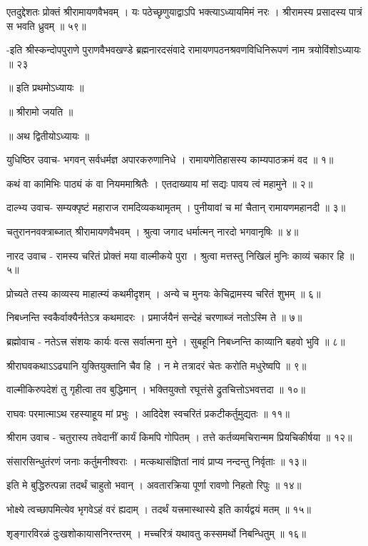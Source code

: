 एतदुद्देशतः प्रोक्तं श्रीरामायणवैभवम् ।
यः पठेच्छृणुयाद्वाऽपि भक्त्याऽध्यायमिमं नरः ।
श्रीरामस्य प्रसादस्य पात्रं स भवति ध्रुवम् ॥ ५९॥

-इति श्रीस्कन्दोपपुराणे पुराणवैभवखण्डे ब्रह्मनारदसंवादे
रामायणपठनश्रवणविधिनिरूपणं नाम त्रयोविंशोऽध्यायः ॥ २३

॥ इति प्रथमोऽध्यायः ॥

॥ श्रीरामो जयति ॥

॥ अथ द्वितीयोऽध्यायः ॥

युधिष्ठिर उवाच-
भगवन् सर्वधर्मज्ञ अपारकरुणानिधे ।
रामायणेतिहासस्य काम्यपाठक्रमं वद ॥ १॥

कथं वा कामिभिः पाठ्यं कं वा नियममाश्रितैः ।
एतदाख्याय मां सद्यः पावय त्वं महामुने ॥ २॥

दाल्भ्य उवाच-
सम्यक्पृष्टं महाराज रामदिव्यकथामृतम् ।
पुनीयावां च मां चैतान् रामायणमहानदी ॥ ३॥

चतुराननवक्त्राब्जात् श्रीरामायणवैभवम् ।
श्रुत्वा जगाद धर्मात्मन् नारदो भगवानृषिः ॥ ४॥

नारद उवाच -
रामस्य चरितं प्रोक्तं मया वाल्मीकये पुरा ।
श्रुत्वा मत्तस्तु निखिलं मुनिः काव्यं चकार हि ॥ ५॥

प्रोच्यते तस्य काव्यस्य माहात्म्यं कथमीदृशम् ।
अन्ये च मुनयः केचिद्रामस्य चरितं शुभम् ॥ ६॥

निबध्नन्ति स्वकैर्वाक्यैर्नतेऽत्र कथमादरः ।
प्रमार्जयैनं सन्देहं चरणाब्जं नतोऽस्मि ते ॥ ७॥

ब्रह्मोवाच -
नतेऽत्त्र संशयः कार्यः वत्स सर्वात्मना मुने ।
सुबहूनि निबध्नन्ति काव्यानि बहवो भुवि ॥ ८॥

श्रीराघवकथाऽऽढ्यानि युक्तियुक्तानि चैव हि ।
न मे तत्रादरं चेतः करोति मधुरेष्वपि ॥ ९॥

वाल्मीकिरुपदेशं तु गृहीत्वा तव बुद्धिमान् ।
भक्तियुक्तो रघूत्तंसे द्रुतचित्तोऽभवत्तदा ॥ १०॥

राघवः परमात्माऽथ रहस्याहूय मां प्रभुः ।
आदिदेश स्वचरितं प्रकटीकर्तुमुद्यतः ॥ ११॥

श्रीराम उवाच -
चतुरास्य तवेदानीं कार्यं किमपि गोपितम् ।
तत्ते कर्तव्यमचिरान्मम प्रियचिकीर्षया ॥ १२॥

संसारसिन्धुतंरणं जनाः कर्तुमनीश्वराः ।
मत्कथासंज्ञितां नावं प्राप्य नन्दन्तु निर्वृताः ॥ १३॥

इति मे बुद्धिरुत्पन्ना तदर्थं चाहुतो भवान् ।
अवतारक्रिया पूर्णा रावणो निहतो रिपुः ॥ १४॥

भोक्ष्ये त्वच्छापमित्येव भृगवेऽहं वरं ह्यदाम् ।
तदर्थं यत्त्रमास्थास्ये इति कार्यद्वयं मतम् ॥ १५॥

श‍ृङ्गारविरळं दुःखशोकायासनिरन्तरम् ।
मच्चरित्रं यथावतु कस्समर्थो निबन्धितुम् ॥ १६॥

